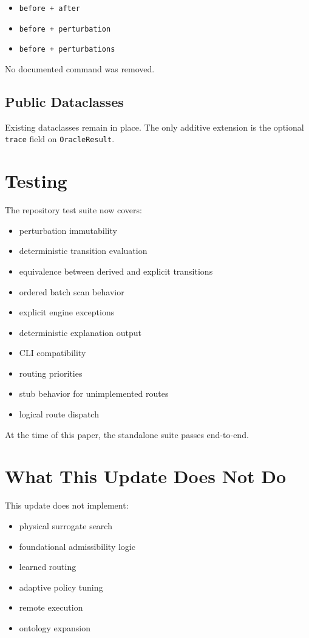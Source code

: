 \documentclass[11pt]{article}
\begin{document}
\begin{itemize}
\item \texttt{before + after}
\item \texttt{before + perturbation}
\item \texttt{before + perturbations}
\end{itemize}

No documented command was removed.

\subsection{Public Dataclasses}

Existing dataclasses remain in place.
The only additive extension is the optional \texttt{trace} field on \texttt{OracleResult}.

\section{Testing}

The repository test suite now covers:

\begin{itemize}
\item perturbation immutability
\item deterministic transition evaluation
\item equivalence between derived and explicit transitions
\item ordered batch scan behavior
\item explicit engine exceptions
\item deterministic explanation output
\item CLI compatibility
\item routing priorities
\item stub behavior for unimplemented routes
\item logical route dispatch
\end{itemize}

At the time of this paper, the standalone suite passes end-to-end.

\section{What This Update Does Not Do}

This update does not implement:

\begin{itemize}
\item physical surrogate search
\item foundational admissibility logic
\item learned routing
\item adaptive policy tuning
\item remote execution
\item ontology expansion
\end{itemize}
\end{document}
